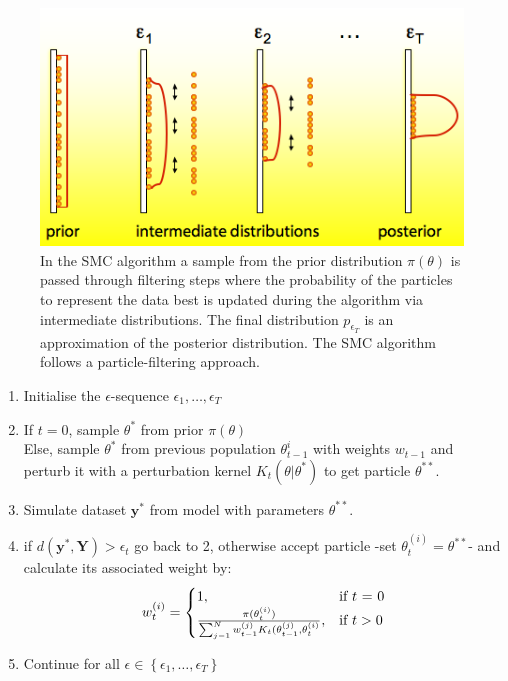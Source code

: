 \begin{figure}
\centering
\includegraphics[width=0.5\linewidth]{ABCSMC}
\caption{In the SMC algorithm a sample from the prior distribution $\pi(\theta)$ is passed through filtering steps where the probability of the particles to represent the data best is updated during the algorithm via intermediate distributions. The final distribution $p_{\epsilon_{T}}$ is an approximation of the posterior distribution. The SMC  algorithm follows a particle-filtering approach.}
\label{fig:smc}
\end{figure}

\begin{enumerate}[noitemsep]
\item{Initialise the $\epsilon$-sequence $\epsilon_{1}, \dots, \epsilon_{T}$}
\item{If $t=0$, sample $\theta^*$ from prior $\pi(\theta)$\\
Else, sample $\theta^*$ from previous population $\theta_{t-1}^{i}$ with weights $w_{t-1}$ and perturb it with a perturbation kernel $K_{t}(\theta|\theta^*) $ to get particle $\theta^{**}$.}
\item{Simulate dataset $\mathbf{y}^*$ from model with parameters $\theta^{**}$.}
\item{if $d(\mathbf{y}^*, \mathbf{Y}) > \epsilon_{t}$ go back to 2, otherwise accept particle -set $\theta_{t}^{(i)} = \theta^{**}$- and calculate its associated weight by:
\begin{equation}
w_{t}^{(i)} = \begin{cases} 1, & \mbox{if } t\mbox{ = 0} \\ \frac{\pi(\theta_{t}^{(i)})}{\sum_{j-1}^N w_{t-1}^{(j)}K_{t}(\theta_{t-1}^{(j)}, \theta_{t}^{(i)}} , & \mbox{if } \mbox{$ t > 0$} \end{cases}
\end{equation} }
\item{Continue for all $\epsilon \in \left\{{\epsilon_{1}, \dots, \epsilon_{T}}\right\}$}
\end{enumerate}

